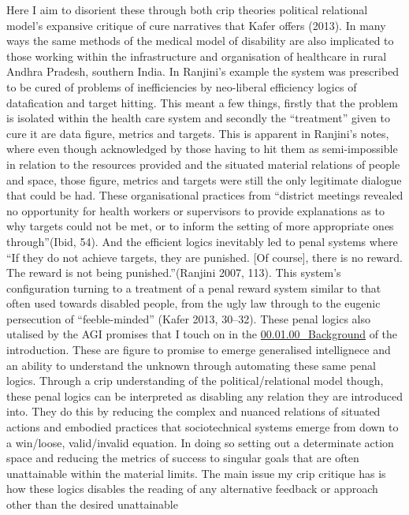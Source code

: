 Here I aim to disorient these through both crip theories political
relational model's expansive critique of cure narratives that Kafer
offers (2013). In many ways the same methods of the medical model of
disability are also implicated to those working within the
infrastructure and organisation of healthcare in rural Andhra Pradesh,
southern India. In Ranjini's example the system was prescribed to be
cured of problems of inefficiencies by neo-liberal efficiency logics of
datafication and target hitting. This meant a few things, firstly that
the problem is isolated within the health care system and secondly the
``treatment'' given to cure it are data figure, metrics and targets.
This is apparent in Ranjini's notes, where even though acknowledged by
those having to hit them as semi-impossible in relation to the resources
provided and the situated material relations of people and space, those
figure, metrics and targets were still the only legitimate dialogue that
could be had. These organisational practices from ``district meetings
revealed no opportunity for health workers or supervisors to provide
explanations as to why targets could not be met, or to inform the
setting of more appropriate ones through''(Ibid, 54). And the efficient
logics inevitably led to penal systems where ``If they do not achieve
targets, they are punished. {[}Of course{]}, there is no reward. The
reward is not being punished.''(Ranjini 2007, 113). This system's
configuration turning to a treatment of a penal reward system similar to
that often used towards disabled people, from the ugly law through to
the eugenic persecution of ``feeble-minded'' (Kafer 2013, 30--32). These
penal logics also utalised by the AGI promises that I touch on in the
\href{../../00_Introduction/sections/00.01.00_Background.md}{00.01.00\_Background}
of the introduction. These are figure to promise to emerge generalised
intellignece and an ability to understand the unknown through automating
these same penal logics. Through a crip understanding of the
political/relational model though, these penal logics can be interpreted
as disabling any relation they are introduced into. They do this by
reducing the complex and nuanced relations of situated actions and
embodied practices that sociotechnical systems emerge from down to a
win/loose, valid/invalid equation. In doing so setting out a determinate
action space and reducing the metrics of success to singular goals that
are often unattainable within the material limits. The main issue my
crip critique has is how these logics disables the reading of any
alternative feedback or approach other than the desired unattainable

